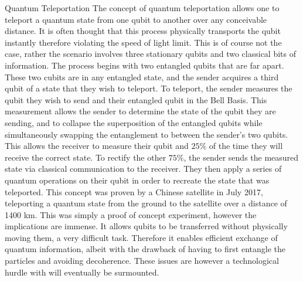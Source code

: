 \documentclass[final, 20pt]{beamer}
\newlength{\onecolwid}
\newlength{\twocolwid}
\begin{document}
\begin{frame}[t]
\begin{columns}[t]
\begin{column}{\twocolwid}
\begin{columns}[t,totalwidth=\twocolwid]
\begin{column}{\onecolwid}
\begin{block}{Quantum Teleportation}
The concept of quantum teleportation allows one to teleport a quantum state from one qubit to another over any conceivable distance. It is often thought that this process physically transports the qubit instantly therefore violating the speed of light limit. This is of course not the case, rather the scenario involves three stationary qubits and two classical bits of information. The process begins with two entangled qubits that are far apart. These two cubits are in any entangled state, and the sender acquires a third qubit of a state that they wish to teleport. To teleport, the sender measures the qubit they wish to send and their entangled qubit in the Bell Basis. This measurement allows the sender to determine the state of the qubit they are sending, and to collapse the superposition of the entangled qubits while simultaneously swapping the entanglement to between the sender's two qubits. This allows the receiver to measure their qubit and $25\%$ of the time they will receive the correct state. To rectify the other $75\%$, the sender sends the measured state via classical communication to the receiver. They then apply a series of quantum operations on their qubit in order to recreate the state that was teleported. This concept was proven by a Chinese satellite in July 2017, teleporting a quantum state from the ground to the satellite over a distance of 1400 km. This was simply a proof of concept experiment, however the implications are immense. It allows qubits to be transferred without physically moving them, a very difficult task. Therefore it enables efficient exchange of quantum information, albeit with the drawback of having to first entangle the particles and avoiding decoherence. These issues are however a technological hurdle with will eventually be surmounted.
\end{block}



\end{column}
\end{columns}
\end{column}
\end{columns}
\end{frame}
\end{document}
